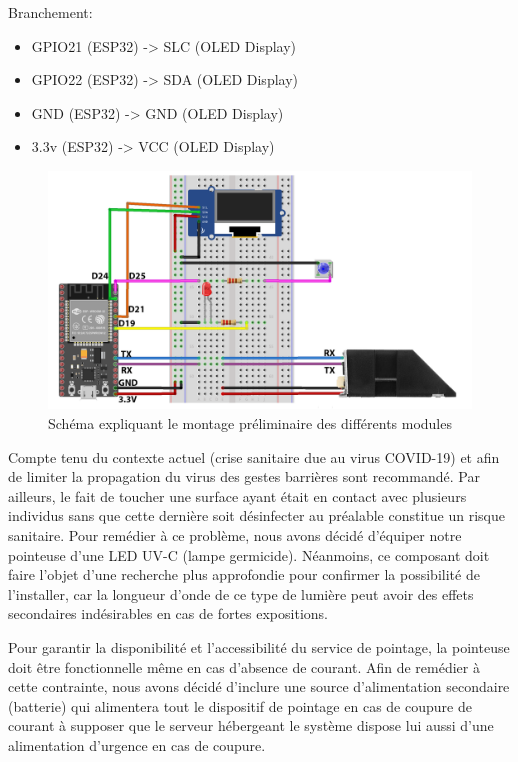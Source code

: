 Branchement: 
\begin{itemize}
    \item [\textbullet]GPIO21 (ESP32) -> SLC (OLED Display)
    \item [\textbullet]GPIO22 (ESP32) -> SDA (OLED Display)
    \item [\textbullet]GND (ESP32) -> GND (OLED Display) 
    \item [\textbullet]3.3v (ESP32) -> VCC (OLED Display)
\end{itemize}    
    
    \begin{figure}[h!]
        \centering
        \includegraphics[scale=0.2]{images/schema/schemat_globale.png}
        \caption{Schéma expliquant le montage préliminaire des différents modules}
        \label{fig54}
    \end{figure}

Compte tenu du contexte actuel (crise sanitaire due au virus COVID-19) et afin 
de limiter la propagation du virus des gestes barrières sont recommandé. Par 
ailleurs, le fait de toucher une surface ayant était en contact avec plusieurs 
individus sans que cette dernière soit désinfecter au préalable constitue un 
risque sanitaire. Pour remédier à ce problème, nous avons décidé d’équiper 
notre pointeuse d’une LED UV-C (lampe germicide). Néanmoins, ce composant doit 
faire l’objet d’une recherche plus approfondie pour confirmer la possibilité 
de l’installer, car la longueur d’onde de ce type de lumière peut avoir des 
effets secondaires indésirables en cas de fortes expositions.

Pour garantir la disponibilité et l’accessibilité du service de pointage, la 
pointeuse doit être fonctionnelle même en cas d’absence de courant. Afin de 
remédier à cette contrainte, nous avons décidé d’inclure une source 
d’alimentation secondaire (batterie) qui alimentera tout le dispositif de 
pointage en cas de coupure de courant à supposer que le serveur hébergeant le 
système dispose lui aussi d’une alimentation d’urgence en cas de coupure.    
   
